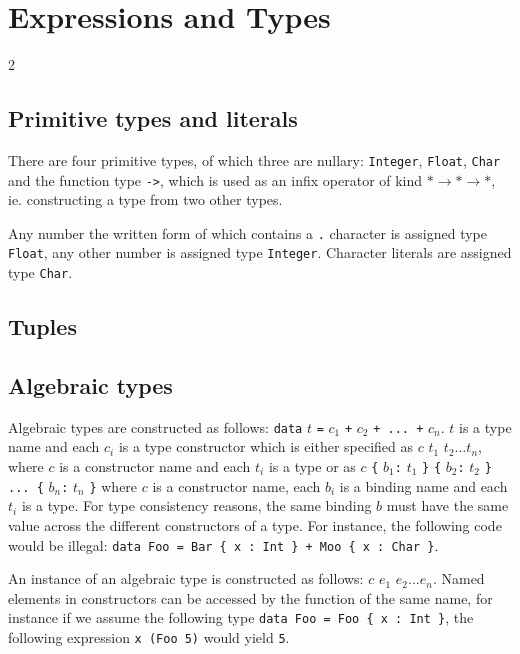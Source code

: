 \chapter{Expressions and Types}

\begin{multicols*}{2}
\section{Primitive types and literals}

There are four primitive types, of which three are nullary:
\verb|Integer|, \verb|Float|, \verb|Char| and the function type
\verb|->|, which is used as an infix operator of kind $* \rightarrow *
\rightarrow *$, ie. constructing a type from two other types.

Any number the written form of which contains a \verb|.| character is
assigned type \verb|Float|, any other number is assigned type
\verb|Integer|. Character literals are assigned type \verb|Char|.

\section{Tuples}

\section{Algebraic types}

Algebraic types are constructed as follows: \verb|data| $t$ \verb|=|
$c_1$ \verb|+| $c_2$ \verb|+ ... +| $c_n$. $t$ is a type name and each
$c_i$ is a type constructor which is either specified as $c$ $t_1$
$t_2 \ldots t_n$, where $c$ is a constructor name and each $t_i$ is a
type or as $c$ \verb|{| $b_1$\verb|:| $t_1$ \verb|}| \verb|{|
$b_2$\verb|:| $t_2$ \verb|} ... {| $b_n$\verb|:| $t_n$ \verb|}| where
$c$ is a constructor name, each $b_i$ is a binding name and each $t_i$
is a type. For type consistency reasons, the same binding $b$ must
have the same value across the different constructors of a type. For
instance, the following code would be illegal:
\verb|data Foo = Bar { x : Int } + Moo { x : Char }|.

An instance of an algebraic type is constructed as follows: $c$ $e_1$
$e_2 \ldots e_n$. Named elements in constructors can be accessed by
the function of the same name, for instance if we assume the following
type \verb|data Foo = Foo { x : Int }|, the following expression
\verb|x (Foo 5)| would yield \verb|5|.


\end{multicols*}
